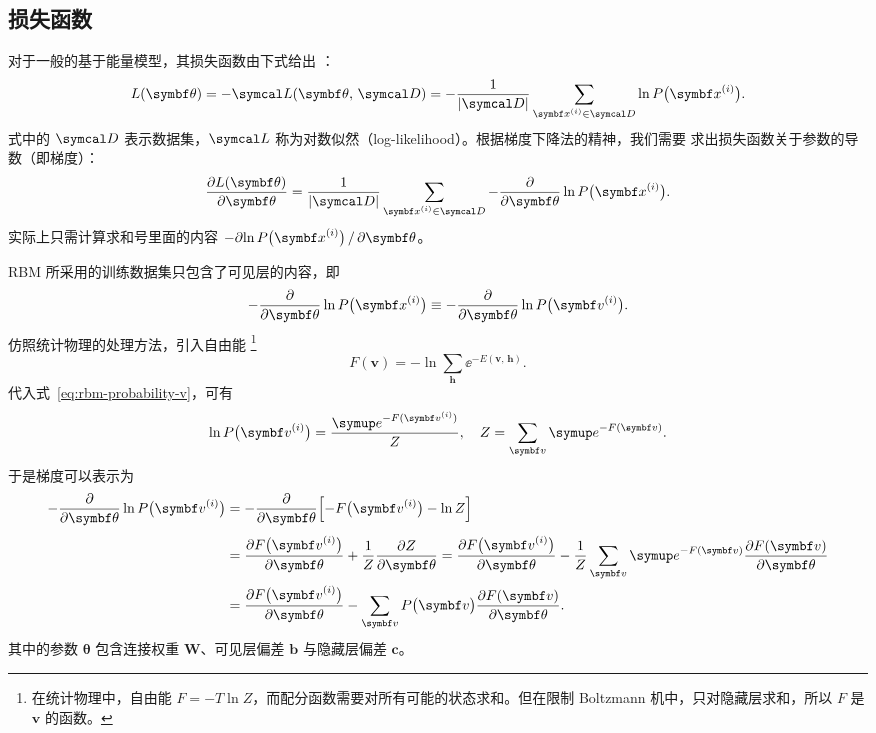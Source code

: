 \subsection{损失函数}

对于一般的基于能量模型，其损失函数由下式给出 \cite{rbmonline}：
\begin{equation}
  \label{eq:ebm-loss-function}
  L(\bm{\theta})
  = - \likeL(\bm{\theta},\,\domD)
  = - \frac{1}{\abs{\domD}} \sum_{\bm{x}^{(i)}\in\domD} \ln P\qty\big(\bm{x}^{(i)}).
\end{equation}
式中的 $\domD$ 表示数据集，$\likeL$ 称为对数似然（log-likelihood）。根据梯度下降法的精神，我们需要
求出损失函数关于参数的导数（即梯度）：
\begin{equation}
  \pdv{L(\bm{\theta})}{\bm{\theta}}
  = \frac{1}{\abs{\domD}} \sum_{\bm{x}^{(i)}\in\domD}
    - \pdv{\bm{\theta}} \ln P\qty\big(\bm{x}^{(i)}).
\end{equation}
实际上只需计算求和号里面的内容 $-\partial{\ln P\qty\big(\bm{x}^{(i)})}\,/\,\partial{\bm{\theta}}$。

RBM 所采用的训练数据集只包含了可见层的内容，即
\begin{equation}
  - \pdv{\bm{\theta}} \ln P\qty\big(\bm{x}^{(i)}) \equiv
  - \pdv{\bm{\theta}} \ln P\qty\big(\bm{v}^{(i)}).
\end{equation}
仿照统计物理的处理方法，引入自由能
\footnote{在统计物理中，自由能 $F=-T\ln Z$，而配分函数需要对所有可能的状态求和。但在限制
  Boltzmann 机中，只对隐藏层求和，所以 $F$ 是 $\bm{v}$ 的函数。} \cite{rbmonline}
\begin{equation}
  F(\bm{v}) = - \ln \sum_{\bm{h}} \ee^{-E(\bm{v},\,\bm{h})}.
\end{equation}
代入式~\eqref{eq:rbm-probability-v}，可有
\begin{equation}
  \ln P\qty\big(\bm{v}^{(i)}) = \frac{\ee^{-F(\bm{v}^{(i)})}}{Z} \qc
  Z = \sum_{\bm{v}} \ee^{-F(\bm{v})}.
\end{equation}
于是梯度可以表示为
\begin{align}
  \label{eq:rmb-gradient}
     - \pdv{\bm{\theta}} \ln P\qty\big(\bm{v}^{(i)})
  &= - \pdv{\bm{\theta}} \qty\Big[-F\qty\big(\bm{v}^{(i)}) - \ln Z]
     \vphantom{\sum_x} \notag \\
  &= \pdv{F\qty\big(\bm{v}^{(i)})}{\bm{\theta}} + \frac{1}{Z} \pdv{Z}{\bm{\theta}}
   = \pdv{F\qty\big(\bm{v}^{(i)})}{\bm{\theta}}
     - \frac{1}{Z} \sum_{\bm{v}} \ee^{-F(\bm{v})} \pdv{F(\bm{v})}{\bm{\theta}} \notag \\
  &= \pdv{F\qty\big(\bm{v}^{(i)})}{\bm{\theta}}
     - \sum_{\bm{v}} P\qty\big(\bm{v}) \pdv{F(\bm{v})}{\bm{\theta}}.
\end{align}
其中的参数 $\bm{\theta}$ 包含连接权重 $\bm{W}$、可见层偏差 $\bm{b}$ 与隐藏层偏差 $\bm{c}$。

